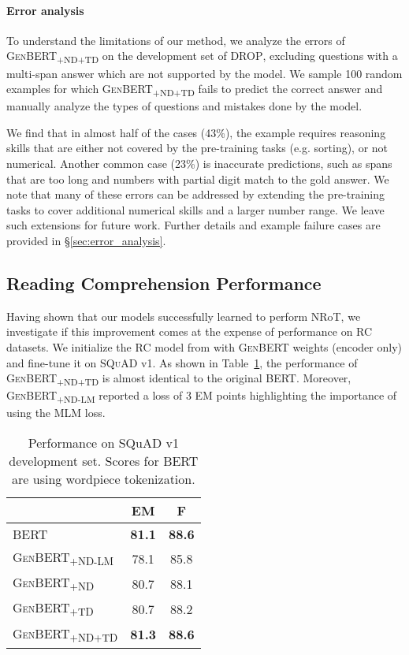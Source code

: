\documentclass[11pt,a4paper]{article}
\newcommand\ssc[1]{\textsubscript{\textsc{#1}}}
\newcommand\bert{\textsc{BERT}}
\newcommand\genbert{\textsc{GenBERT}}
\newcommand\drop{\textsc{DROP}}
\newcommand\squad{\textsc{SQuAD}}
\begin{document}
\paragraph{Error analysis}  
To understand the limitations of our method, we analyze the errors of \textsc{GenBERT\ssc{+ND+TD}} on the development set of \drop{}, excluding questions with a multi-span answer which are not supported by the model.
We sample 100 random examples for which \textsc{GenBERT\ssc{+ND+TD}} fails to predict the correct answer and manually analyze the types of questions and mistakes done by the model.

We find that in almost half of the cases (43\%), the example requires reasoning skills that are either not covered by the pre-training tasks (e.g. sorting), or not numerical. 
Another common case (23\%) is inaccurate predictions, such as spans that are too long and numbers with partial digit match to the gold answer.
We note that many of these errors can be addressed by extending the pre-training tasks to cover additional numerical skills and a larger number range. We leave such extensions for future work.
Further details and example failure cases are provided in \S\ref{sec:error_analysis}.


\subsection{Reading Comprehension Performance}
Having shown that our models successfully learned to perform NRoT, we investigate if this improvement comes at the expense of performance on RC datasets. We initialize the RC model from 
\citet{devlin2018bert} with \genbert{} weights (encoder only) and fine-tune it on \squad{} v1. As shown in
Table~\ref{table:squad_performance}, the performance of  \textsc{GenBERT\ssc{+ND+TD}} is almost identical to the original \bert{}. Moreover, \textsc{GenBERT\ssc{+ND-LM}} reported a loss of 3 EM points  highlighting the importance of using the MLM loss.




\begin{table}[t]\setlength{\belowcaptionskip}{-10pt}
    \footnotesize
    \centering
    \begin{tabular}{l|c|c|}
         & EM & F \\ \hline
         \textsc{BERT} & \bf 81.1 & \bf 88.6 \\
\textsc{GenBERT\ssc{+ND-LM}} & 78.1 & 85.8 \\
\textsc{GenBERT\ssc{+ND}} & 80.7 & 88.1 \\
         \textsc{GenBERT\ssc{+TD}} & 80.7 & 88.2 \\
         \textsc{GenBERT\ssc{+ND+TD}} & \bf 81.3 & \bf 88.6
    \end{tabular}
    \caption{Performance on SQuAD v1 development set. Scores for \textsc{BERT} are using wordpiece tokenization.
    }
    \label{table:squad_performance}
\end{table}
\end{document}
